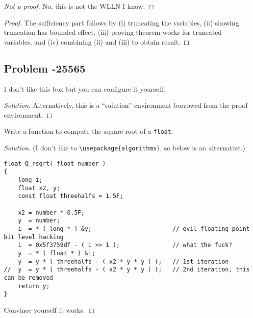 \documentclass[openany]{article}
\begin{document}
\begin{proof}[Not a proof]{}
		No, this is not the WLLN I know.
\end{proof}

\begin{proof}{}{}
		The sufficiency part follows by (i) truncating the variables, (ii) showing truncation has bounded effect, (iii) proving theorem works for truncated variables, and (iv) combining (ii) and (iii) to obtain result.
\end{proof}


\subsection*{Problem -25565} %


\begin{solution*}{}{}
		I don't like this box but you can configure it yourself.
\end{solution*}

\begin{proof}[Solution]{}
		\renewcommand{\qedsymbol}{} %
		Alternatively, this is a ``solution'' environment borrowed from the proof environment. 
\end{proof}

\begin{problem*}{}{}
		Write a function to compute the square root of a \texttt{float}.
\end{problem*}

\begin{proof}[Solution]{}
		\renewcommand{\qedsymbol}{}
		(I don't like to \verb|\usepackage{algorithms}|, so below is an alternative.) 
		\begin{lstlisting}[basicstyle=\fontsize{8}{9}\selectfont\ttfamily]
float Q_rsqrt( float number )
{
	long i;
	float x2, y;
	const float threehalfs = 1.5F;

	x2 = number * 0.5F;
	y  = number;
	i  = * ( long * ) &y;                       // evil floating point bit level hacking
	i  = 0x5f3759df - ( i >> 1 );               // what the fuck? 
	y  = * ( float * ) &i;
	y  = y * ( threehalfs - ( x2 * y * y ) );   // 1st iteration
//	y  = y * ( threehalfs - ( x2 * y * y ) );   // 2nd iteration, this can be removed
	return y;
}
		\end{lstlisting} 
		Convince yourself it works.
\end{proof}
\end{document}

